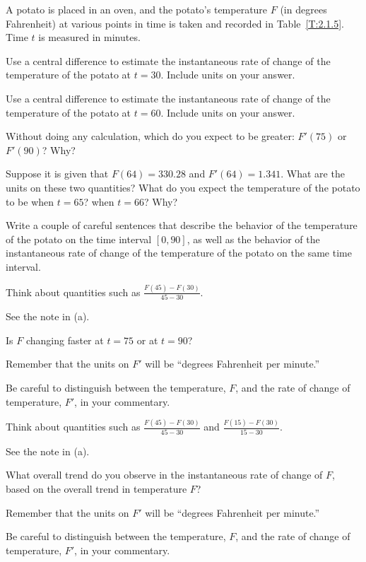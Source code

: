 \begin{activity} \label{A:2.1.5}
A potato is placed in an oven, and the potato's temperature $F$ (in degrees Fahrenheit) at various points in time is taken and recorded in Table~\ref{T:2.1.5}. Time $t$ is measured in minutes.

\ba
	\item Use a central difference to estimate the instantaneous rate of change of the temperature of the potato at $t= 30$. Include units on your answer. 
	\item Use a central difference to estimate the instantaneous rate of change of the temperature of the potato at $t= 60$. Include units on your answer. 
	\item Without doing any calculation, which do you expect to be greater: $F'(75)$ or $F'(90)$?  Why?
	\item Suppose it is given that $F(64) = 330.28$ and $F'(64) = 1.341$.  What are the units on these two quantities?  What do you expect the temperature of the potato to be when $t = 65$?  when $t = 66$?  Why?
	\item Write a couple of careful sentences that describe the behavior of the temperature of the potato on the time interval $[0,90]$, as well as the behavior of the instantaneous rate of change of the temperature of the potato on the same time interval.
\ea

\end{activity}
\begin{smallhint}
\ba
	\item Think about quantities such as $\frac{F(45)-F(30)}{45-30}$.
	\item See the note in (a).
	\item Is $F$ changing faster at $t = 75$ or at $t = 90$?
	\item Remember that the units on $F'$ will be ``degrees Fahrenheit per minute.''
	\item Be careful to distinguish between the temperature, $F$, and the rate of change of temperature, $F'$, in your commentary.
\ea
\end{smallhint}
\begin{bighint}
\ba
	\item Think about quantities such as $\frac{F(45)-F(30)}{45-30}$ and $\frac{F(15)-F(30)}{15-30}$.
	\item See the note in (a).
	\item What overall trend do you observe in the instantaneous rate of change of $F$, based on the overall trend in temperature $F$?
	\item Remember that the units on $F'$ will be ``degrees Fahrenheit per minute.''
	\item Be careful to distinguish between the temperature, $F$, and the rate of change of temperature, $F'$, in your commentary.
\ea
\end{bighint}

